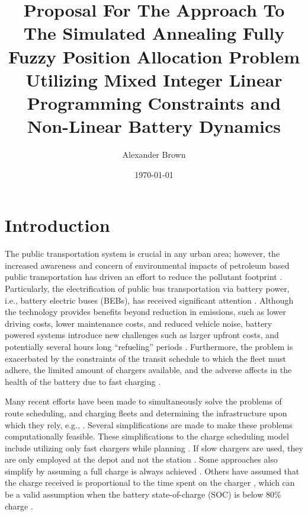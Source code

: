 \documentclass[11pt,a4paper,final]{article}
\author{Alexander Brown}
\date{\today}
\title{Proposal For The Approach To The Simulated Annealing Fully Fuzzy Position Allocation Problem Utilizing Mixed Integer Linear Programming Constraints and Non-Linear Battery Dynamics}
\begin{document}
\maketitle
\tableofcontents

\parskip 3mm                                %
\let\ref\autoref                            %

\let\ref\autoref                            %

\section{Introduction}
\label{sec:introduction}
The public transportation system is crucial in any urban area; however, the increased awareness and concern of
environmental impacts of petroleum based public transportation has driven an effort to reduce the pollutant footprint
\cite{de-2014-simul-elect,xylia-2018-role-charg,guida-2017-zeeus-repor-europ,li-2016-batter-elect}. Particularly,
the electrification of public bus transportation via battery power, i.e., battery electric buses (BEBs), has received
significant attention \cite{li-2016-batter-elect}. Although the technology provides benefits beyond reduction in
emissions, such as lower driving costs, lower maintenance costs, and reduced vehicle noise, battery powered systems
introduce new challenges such as larger upfront costs, and potentially several hours long ``refueling'' periods
\cite{xylia-2018-role-charg,li-2016-batter-elect}. Furthermore, the problem is exacerbated by the constraints of the
transit schedule to which the fleet must adhere, the limited amount of chargers available, and the adverse affects in
the health of the battery due to fast charging \cite{lutsey-2019-updat-elect}.

Many recent efforts have been made to simultaneously solve the problems of route scheduling, and charging fleets and
determining the infrastructure upon which they rely, e.g., \cite{wei-2018-optim-spatio,sebastiani-2016-evaluat-elect,hoke-2014-accoun-lithium,wang-2017-elect-vehic}. Several simplifications are made to make these problems
computationally feasible. These simplifications to the charge scheduling model include utilizing only fast chargers
while planning \cite{wei-2018-optim-spatio,sebastiani-2016-evaluat-elect,wang-2017-optim-rechar,zhou-2020-bi-objec,yang-2018-charg-sched,wang-2017-elect-vehic,qin-2016-numer-analy,liu-2020-batter-elect}. If slow chargers are used,
they are only employed at the depot and not the station \cite{he-2020-optim-charg,tang-2019-robus-sched}. Some
approaches also simplify by assuming a full charge is always achieved
\cite{wei-2018-optim-spatio,wang-2017-elect-vehic,zhou-2020-bi-objec,wang-2017-optim-rechar}. Others have assumed
that the charge received is proportional to the time spent on the charger
\cite{liu-2020-batter-elect,yang-2018-charg-sched}, which can be a valid assumption when the battery state-of-charge
(SOC) is below 80\% charge \cite{liu-2020-batter-elect}.
\end{document}

